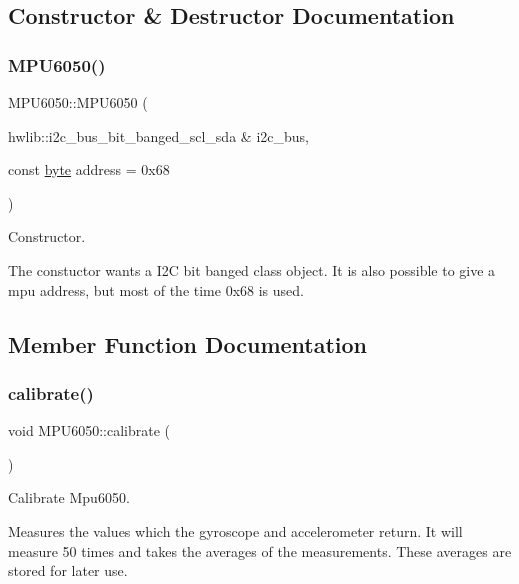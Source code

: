 \subsection{Constructor \& Destructor Documentation}
\mbox{\label{class_m_p_u6050_a5bb94c2ee72b6555f89fbd5b14dd0460}} 
\subsubsection{\texorpdfstring{M\+P\+U6050()}{MPU6050()}}
{\footnotesize\ttfamily M\+P\+U6050\+::\+M\+P\+U6050 (\begin{DoxyParamCaption}\item[{hwlib\+::i2c\+\_\+bus\+\_\+bit\+\_\+banged\+\_\+scl\+\_\+sda \&}]{i2c\+\_\+bus,  }\item[{const \mbox{\hyperlink{_m_p_u6050_8hpp_a71809484a26cd96c6abe839a0a8a289d}{byte}}}]{address = {\ttfamily 0x68} }\end{DoxyParamCaption})\hspace{0.3cm}{\ttfamily [inline]}}



Constructor. 

The constuctor wants a I2C bit banged class object. It is also possible to give a mpu address, but most of the time 0x68 is used. 

\subsection{Member Function Documentation}
\mbox{\label{class_m_p_u6050_a35657154dd30e206e09ea6407ede106c}} 
\subsubsection{\texorpdfstring{calibrate()}{calibrate()}}
{\footnotesize\ttfamily void M\+P\+U6050\+::calibrate (\begin{DoxyParamCaption}{ }\end{DoxyParamCaption})}



Calibrate Mpu6050. 

Measures the values which the gyroscope and accelerometer return. It will measure 50 times and takes the averages of the measurements. These averages are stored for later use. \mbox{\label{class_m_p_u6050_aec768f09d9fb4a578a67ac56cefb1f65}} 

